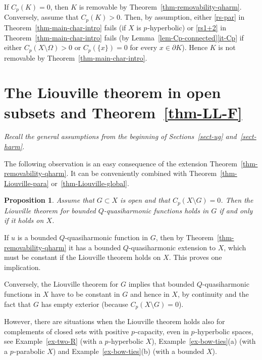 \documentclass[a4paper,twoside]{article}
\makeatletter
\theoremstyle{propositional}
\newtheorem{prop}[thm]{Proposition}
\theoremstyle{descriptive}
\theoremstyle{remarkstyle}
\renewenvironment{proof}[1][\proofname]{\par
  \pushQED{\qed}%
  \normalfont
  \trivlist
  \item[\hskip\labelsep
        \itshape
    #1\@addpunct{.}]\ignorespaces
}{%
  \popQED\endtrivlist\@endpefalse
}
\newcommand{\setm}{\setminus}
\newcommand{\Cp}{{C_p}}
\newcommand{\bdry}{\partial}
\newcommand{\bdy}{\bdry}
\newcommand{\Om}{\Omega}
\newcommand{\p}{{$p\mspace{1mu}$}}
\numberwithin{equation}{section}
\makeatother
\begin{document}
\begin{proof}[Proof of Corollary~\ref{cor-remove-K-from-X-hyp}]
If $\Cp(K)=0$, then $K$ is removable by Theorem~\ref{thm-removability-qharm}.
Conversely, assume that $\Cp(K)>0$.
Then, by assumption, either \ref{rs-par} 
in Theorem~\ref{thm-main-char-intro}
fails (if $X$ is \p-hyperbolic)
or \ref{rs1+2} 
in Theorem~\ref{thm-main-char-intro}
fails (by Lemma~\ref{lem-Cp-connected}\ref{it-Cp}
if either $\Cp(X\setm \Om)>0$ or $\Cp(\{x\})=0$ for every $x \in \bdy K$).
Hence $K$ is not removable by 
Theorem~\ref{thm-main-char-intro}.
\end{proof}




\section{The Liouville theorem in open subsets
and  Theorem~\ref{thm-LL-F}}
\label{sect-Liouville-G}

\emph{Recall the general assumptions from the beginning of Sections~\ref{sect-ug}
and~\ref{sect-harm}.}

\medskip



The following observation is an easy consequence
of the extension Theorem~\ref{thm-removability-qharm}.
It can be conveniently combined with
Theorem~\ref{thm-Liouville-para} or~\ref{thm-Liouville-global}.

\begin{prop} \label{prop-L-CpF=0-new}
Assume that $G \subset X$ is open and that  $\Cp(X \setm G)=0$.
Then the Liouville theorem for bounded $Q$-quasiharmonic functions 
holds in $G$ if and only if it holds on $X$. 
\end{prop}

\begin{proof}
If $u$ is a bounded $Q$-quasiharmonic function in $G$,
then by Theorem~\ref{thm-removability-qharm}
 it has a bounded $Q$-quasiharmonic  extension to $X$,
which must be constant if the  Liouville theorem holds on $X$.
This proves one implication.

Conversely, the  Liouville theorem for $G$ implies that bounded 
$Q$-quasiharmonic functions in $X$ have to be constant 
in $G$ and hence in $X$, by continuity and the fact that 
$G$ has empty exterior (because $\Cp(X\setm G)=0$).
\end{proof}


However, there are situations when the Liouville theorem holds also for
complements of closed sets with positive \p-capacity, even in \p-hyperbolic spaces,
see Example~\ref{ex-two-R} (with a \p-hyperbolic $X$), 
Example~\ref{ex-bow-ties}(a) (with a \p-parabolic $X$)
and Example~\ref{ex-bow-ties}(b) (with a bounded $X$).
\end{document}
